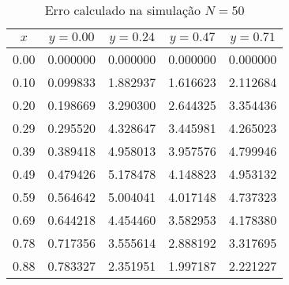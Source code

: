 \documentclass[column,amsmath,amssymb,floatfix]{revtex4}
\begin{document}
\begin{enumerate}
\begin{enumerate}
    
                \begin{table}[H]
                    \centering
                    \caption{Erro calculado na simulação $N=50$}
                    \label{tab:erro_xy_50}
                    \renewcommand{\arraystretch}{1.25}
                    \setlength{\tabcolsep}{12pt}
                    \begin{tabular}{|c|c|c|c|c|}
                        \hline
                        \textbf{$x$} & \textbf{$y = 0.00$} & \textbf{$y = 0.24$} & \textbf{$y = 0.47$} & \textbf{$y = 0.71$} \\ \hline
                        0.00 & 0.000000 & 0.000000 & 0.000000 & 0.000000 \\ \hline
                        0.10 & 0.099833 & 1.882937 & 1.616623 & 2.112684 \\ \hline
                        0.20 & 0.198669 & 3.290300 & 2.644325 & 3.354436 \\ \hline
                        0.29 & 0.295520 & 4.328647 & 3.445981 & 4.265023 \\ \hline
                        0.39 & 0.389418 & 4.958013 & 3.957576 & 4.799946 \\ \hline
                        0.49 & 0.479426 & 5.178478 & 4.148823 & 4.953132 \\ \hline
                        0.59 & 0.564642 & 5.004041 & 4.017148 & 4.737323 \\ \hline
                        0.69 & 0.644218 & 4.454460 & 3.582953 & 4.178380 \\ \hline
                        0.78 & 0.717356 & 3.555614 & 2.888192 & 3.317695 \\ \hline
                        0.88 & 0.783327 & 2.351951 & 1.997187 & 2.221227 \\ \hline
                    \end{tabular}
                \end{table}
    

\end{enumerate}
\end{enumerate}
\end{document}
